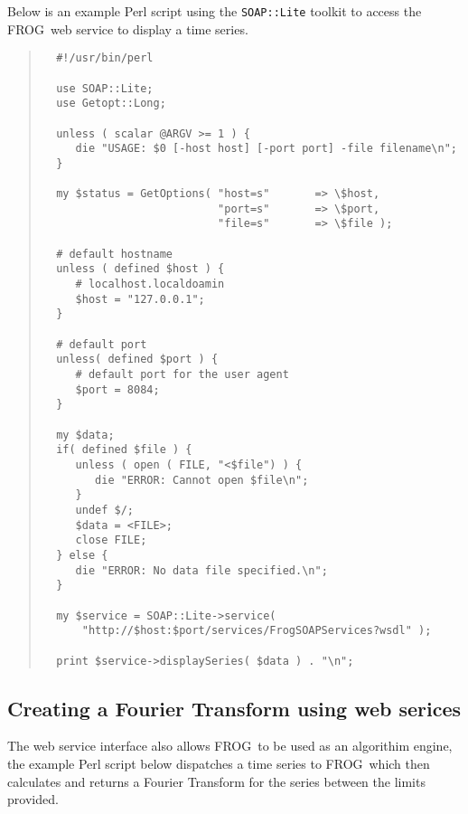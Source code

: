 \documentclass[twoside,11pt]{article}
\newcommand{\xlabel}[1]{}
\renewcommand{\_}{\texttt{\symbol{95}}}
\newcommand{\FROG}{\textsf{FROG}}
\begin{document}
Below is an example Perl script using the \verb+SOAP::Lite+ toolkit to access the \FROG\ web service to display a time series.

\begin{quote}
\begin{verbatim}
  #!/usr/bin/perl

  use SOAP::Lite;
  use Getopt::Long;

  unless ( scalar @ARGV >= 1 ) {
     die "USAGE: $0 [-host host] [-port port] -file filename\n";
  }
    
  my $status = GetOptions( "host=s"       => \$host,
                           "port=s"       => \$port,
                           "file=s"       => \$file );
  
  # default hostname
  unless ( defined $host ) {
     # localhost.localdoamin
     $host = "127.0.0.1";
  } 

  # default port
  unless( defined $port ) {
     # default port for the user agent
     $port = 8084;   
  } 
  
  my $data;
  if( defined $file ) {
     unless ( open ( FILE, "<$file") ) {
        die "ERROR: Cannot open $file\n";
     }
     undef $/;
     $data = <FILE>;
     close FILE;
  } else {
     die "ERROR: No data file specified.\n";
  }
  
  my $service = SOAP::Lite->service(
      "http://$host:$port/services/FrogSOAPServices?wsdl" );
    
  print $service->displaySeries( $data ) . "\n";    
\end{verbatim}
\end{quote}

\subsection{Creating a Fourier Transform using web serices\xlabel{generating_an_fft_via_ws}}

The web service interface also allows \FROG\ to be used as an algorithim engine, the example Perl script below dispatches a time series to \FROG\ which then calculates and returns a Fourier Transform for the series between the limits provided.
\end{document}
